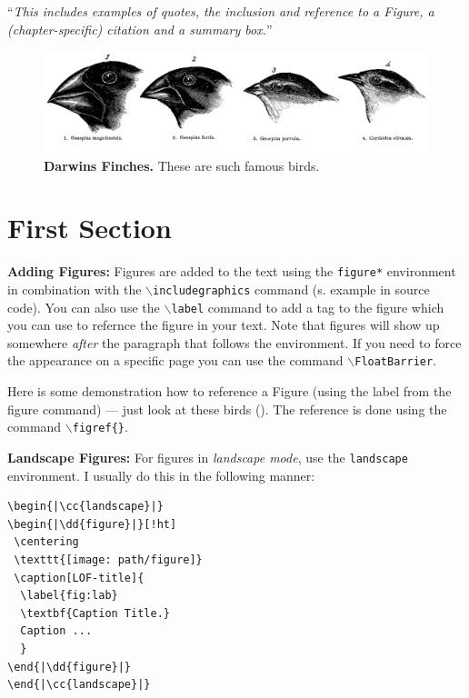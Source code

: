 ``\textit{This includes examples of quotes, the inclusion and reference to a Figure, a (chapter-specific) citation and a summary box.}''\\

\begin{multicols}{2}
\begin{figure}[!hb] %
\centering
\includegraphics[width = \fwidth]{figures/ci/finches.png}
\caption[Darwins Finches]{\label{fig:cif1}\textbf{Darwins Finches.} These are such famous birds.
}
\end{figure}

\section{First Section}

\textbf{Adding Figures:}
Figures are added to the text using the \texttt{figure*} environment in combination with the \texttt{$\backslash$includegraphics} command (s. example in source code).
You can also use the \texttt{$\backslash$label} command to add a tag to the figure which you can use to refernce the figure in your text.
Note that figures will show up somewhere \textit{after} the paragraph that follows the  environment. If you need to force the appearance on a specific page you can use the command \texttt{$\backslash$FloatBarrier}.

Here is some demonstration how to reference a Figure (using the label from the figure command) --- just look at these birds ().
The reference is done using the command \texttt{$\backslash$figref\{\}}.

\textbf{Landscape Figures:} For figures in \textit{landscape mode}, use the \texttt{landscape} environment.
I usually do this in the following manner:

\begin{tcolorbox}[arc=0pt,outer arc=0pt,breakable,colback=black!05,colframe=black!10,pad at break=2mm,boxrule=0.1pt]
\begin{lstlisting}
\begin{|\cc{landscape}|}
\begin{|\dd{figure}|}[!ht]
 \centering
 \texttt{[image: path/figure]}
 \caption[LOF-title]{
  \label{fig:lab}
  \textbf{Caption Title.}
  Caption ...
  }
\end{|\dd{figure}|}
\end{|\cc{landscape}|}
\end{lstlisting}
\end{tcolorbox}


\end{multicols}
